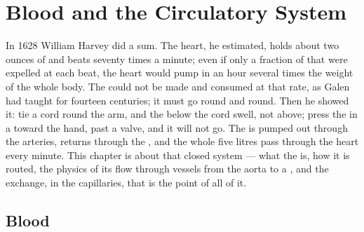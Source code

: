 \chapter{Blood and the Circulatory System}\label{ch:b2:blood-circulation}

In 1628 William Harvey did a sum. The heart, he estimated, holds
about two ounces of  and beats seventy times a minute; even if
only a fraction of that were expelled at each beat, the heart would
pump in an hour several times the weight of the whole body. The
 could not be made and consumed at that rate, as Galen had
taught for fourteen centuries; it must go round and round. Then he
showed it: tie a cord round the arm, and the  below the cord
swell, not above; press the  in a  toward the hand, past a
valve, and it will not go. The  is pumped out through the
arteries, returns through the , and the whole five litres pass
through the heart every minute. This chapter is about that closed
system --- what the  is, how it is routed, the physics of its
flow through vessels from the aorta to a , and the
exchange, in the capillaries, that is the point of all of it.

\section{Blood}

